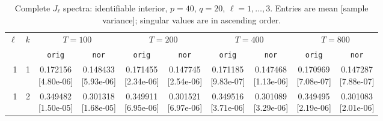 \documentclass[12pt,letterpaper]{article}
\def\spacingset#1{\renewcommand{\baselinestretch}{#1}\small\normalsize}
\theoremstyle{plain}
\theoremstyle{definition}
\begin{document}
\begin{table}[p]
\begingroup
\spacingset{1.0}
\small\centering
\caption{Complete $J_\ell$ spectra: identifiable interior, $p=40$, $q=20$, $\ell=1,\ldots,3$. Entries are mean [sample variance]; singular values are in ascending order.}
\label{s23:lambda:alltab:spectra:p40q20interior:1-3}
\footnotesize
\setlength{\tabcolsep}{2.2pt}
\renewcommand{\arraystretch}{1.03}
\begin{adjustbox}{max width=\linewidth}
\begin{tabular}{@{}rr*{8}{c}@{}}
\toprule
$\ell$ & $k$ & \multicolumn{2}{c}{$T=100$} & \multicolumn{2}{c}{$T=200$} & \multicolumn{2}{c}{$T=400$} & \multicolumn{2}{c}{$T=800$}\\
\cmidrule(lr){3-4}\cmidrule(lr){5-6}\cmidrule(lr){7-8}\cmidrule(lr){9-10}
 &  & \texttt{orig} & \texttt{nor} & \texttt{orig} & \texttt{nor} & \texttt{orig} & \texttt{nor} & \texttt{orig} & \texttt{nor}\\
\midrule
1 & 1 & \shortstack{0.172156\\[-1pt]{\scriptsize[4.80e-06]}} & \shortstack{0.148433\\[-1pt]{\scriptsize[5.93e-06]}} & \shortstack{0.171455\\[-1pt]{\scriptsize[2.34e-06]}} & \shortstack{0.147745\\[-1pt]{\scriptsize[2.54e-06]}} & \shortstack{0.171185\\[-1pt]{\scriptsize[9.83e-07]}} & \shortstack{0.147468\\[-1pt]{\scriptsize[1.13e-06]}} & \shortstack{0.170969\\[-1pt]{\scriptsize[7.08e-07]}} & \shortstack{0.147287\\[-1pt]{\scriptsize[7.88e-07]}}\\
1 & 2 & \shortstack{0.349482\\[-1pt]{\scriptsize[1.50e-05]}} & \shortstack{0.301318\\[-1pt]{\scriptsize[1.68e-05]}} & \shortstack{0.349911\\[-1pt]{\scriptsize[6.95e-06]}} & \shortstack{0.301521\\[-1pt]{\scriptsize[6.97e-06]}} & \shortstack{0.349516\\[-1pt]{\scriptsize[3.71e-06]}} & \shortstack{0.301089\\[-1pt]{\scriptsize[3.29e-06]}} & \shortstack{0.349495\\[-1pt]{\scriptsize[2.19e-06]}} & \shortstack{0.301083\\[-1pt]{\scriptsize[2.01e-06]}}\\

\end{tabular}
\end{adjustbox}
\end{table}
\end{document}
